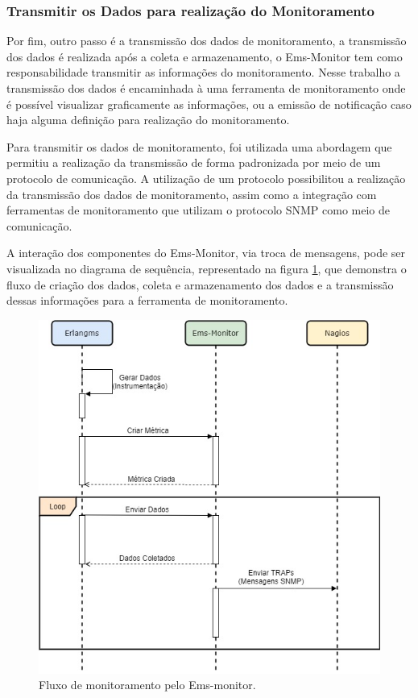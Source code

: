 \subsubsection{Transmitir os Dados para realização do Monitoramento}
Por fim, outro passo é a transmissão dos dados de monitoramento, a transmissão dos dados é realizada após a coleta e armazenamento, o Ems-Monitor tem como responsabilidade transmitir as informações do monitoramento. Nesse trabalho a transmissão dos dados é encaminhada à uma ferramenta de monitoramento onde é possível visualizar graficamente as informações, ou a emissão de notificação caso haja alguma definição para realização do monitoramento.

Para transmitir os dados de monitoramento, foi utilizada uma abordagem que permitiu a realização da transmissão de forma padronizada por meio de um protocolo de comunicação. A utilização de um protocolo possibilitou a realização da transmissão dos dados de monitoramento, assim como a integração com ferramentas de monitoramento que utilizam o protocolo \acrshort{SNMP} como meio de comunicação.  

A interação dos componentes do Ems-Monitor, via troca de mensagens, pode ser visualizada no diagrama de sequência, representado na figura \ref{fun:fig:ems-monitor-sequencia}, que demonstra o fluxo de criação dos dados, coleta e armazenamento dos dados e a transmissão dessas informações para a ferramenta de monitoramento. 

\begin{figure}[H]
	\begin{center}
	\includegraphics[scale = 0.60]{img/Sequencia_Ems-Monitor.jpg}
	\caption{Fluxo de monitoramento pelo Ems-monitor.}
	\label{fun:fig:ems-monitor-sequencia}
	\end{center}
\end{figure}



